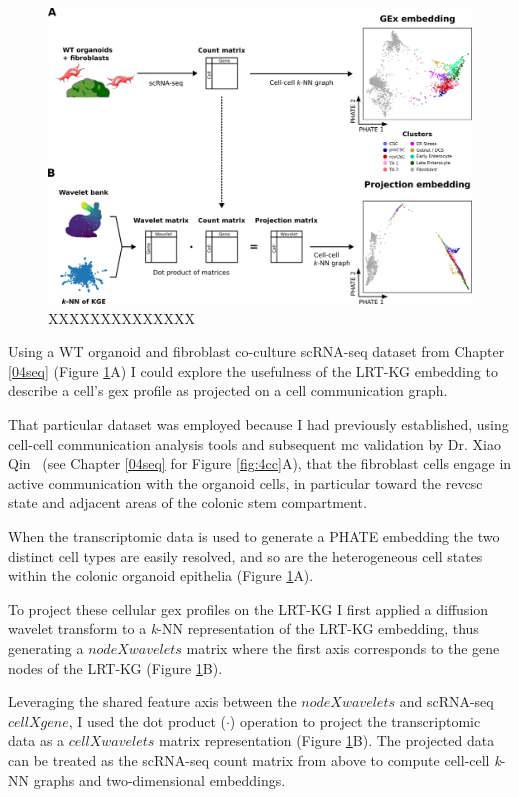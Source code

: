 \begin{figure}
    \centering
    \includegraphics{06kg/figs/6KG_projection.png}
    \caption{XXXXXXXXXXXXXX}
    \label{fig:6project}
\end{figure}

Using a WT organoid and fibroblast co-culture scRNA-seq dataset from Chapter \ref{04seq} (Figure \ref{fig:6project}A) I could explore the usefulness of the LRT-KG embedding to describe a cell's \acrfull{gex} profile as projected on a cell communication graph. 

That particular dataset was employed because I had previously established, using cell-cell communication analysis tools and subsequent \acrshort{mc} validation by Dr. Xiao Qin~\cite{cardoso_rodriguez_single-cell_2023} (see Chapter \ref{04seq} for Figure \ref{fig:4cc}A), that the fibroblast cells engage in active communication with the organoid cells, in particular toward the \acrshort{revcsc} state and adjacent areas of the colonic stem compartment. 

When the transcriptomic data is used to generate a PHATE embedding the two distinct cell types are easily resolved, and so are the heterogeneous cell states within the colonic organoid epithelia (Figure \ref{fig:6project}A).

To project these cellular \acrshort{gex} profiles on the LRT-KG I first applied a diffusion wavelet transform to a \emph{k}-NN representation of the LRT-KG embedding, thus generating a \(node X wavelets\) matrix where the first axis corresponds to the gene nodes of the LRT-KG (Figure \ref{fig:6project}B). 

Leveraging the shared feature axis between the \(node X wavelets\) and scRNA-seq \(cell X gene\), I used the dot product (\(\cdot\)) operation to project the transcriptomic data as a \(cell X wavelets\) matrix representation (Figure \ref{fig:6project}B). The projected data can be treated as the scRNA-seq count matrix from above to compute cell-cell \emph{k}-NN graphs and two-dimensional embeddings.

